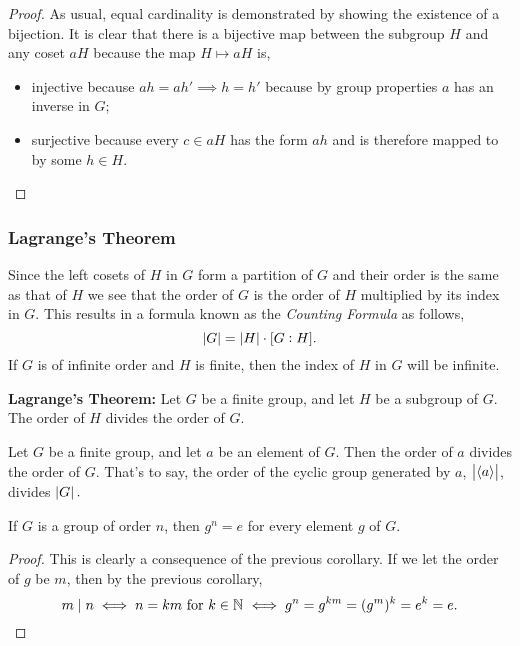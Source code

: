 \documentclass[MathsNotesBase.tex]{subfiles}
\begin{document}
{	
	\begin{proof}
		As usual, equal cardinality is demonstrated by showing the existence of a bijection. It is clear that there is a bijective map between the subgroup $H$ and any coset $aH$ because the map $H \longmapsto aH$ is,
		\begin{itemize}
			\item{injective because $ah = ah' \implies h = h'$ because by group properties $a$ has an inverse in $G$;}
			\item{surjective because every $c \in aH$ has the form $ah$ and is therefore mapped to by some $h \in H$.}
		\end{itemize}
	\end{proof}

	\subsubsection{Lagrange's Theorem}
	Since the left cosets of $H$ in $G$ form a partition of $G$ and their order is the same as that of $H$ we see that the order of $G$ is the order of $H$ multiplied by its index in $G$. This results in a formula known as the \textit{Counting Formula} as follows,
	\[ \left\lvert G\right\rvert = \left\lvert H\right\rvert \cdot [G:H]. \]
	If $G$ is of infinite order and $H$ is finite, then the index of $H$ in $G$ will be infinite.
	
	\begin{theorem}
		\textbf{Lagrange's Theorem: } Let $G$ be a finite group, and let $H$ be a subgroup of $G$. The order of $H$ divides the order of $G$.
	\end{theorem}

	\medskip
	\begin{corollary}
		Let $ G $ be a finite group, and let $ a $ be an element of $ G $. Then the order of $ a $ divides the order of $G$. That's to say, the order of the cyclic group generated by $a$, ${ \left\lvert\langle a \rangle\right\rvert }$, divides ${ \left\lvert G\right\rvert. }$
	\end{corollary}

	\medskip
	\begin{corollary}
		\label{coro:group_order_n_nth_power_of_elements_is_identity}
		If $ G $ is a group of order $ n $, then ${ g^n = e }$ for every element $ g $ of $ G $.
	\end{corollary}
	\begin{proof}
		This is clearly a consequence of the previous corollary. If we let the order of $g$ be $m$, then by the previous corollary, 
		\[ m \mid n \iff n = km \text{ for } k \in \mathbb{N}^{} \iff g^n = g^{km} = (g^m)^k = e^k = e. \qedhere \]
	\end{proof}

}
\end{document}
